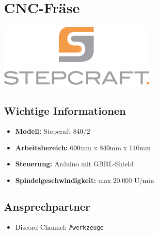 \documentclass{article}
\begin{document}
	
	\noindent
	\begin{minipage}{0.25\textwidth}
		\section*{CNC-Fräse}
	\end{minipage}
	\hfill
	\begin{minipage}{0.2\textwidth}
		\includegraphics[width=\textwidth]{sc-logo.png}
	\end{minipage}
	\hspace{2em}	
	\begin{minipage}{0.1\textwidth}
				
	\end{minipage}%
	
	\subsection*{Wichtige Informationen}
	\begin{itemize}
		\item \textbf{Modell:} Stepcraft 840/2
		\item \textbf{Arbeitsbereich:} 600mm x 840mm x 140mm
		\item \textbf{Steuerung:} Arduino mit GBRL-Shield
		\item \textbf{Spindelgeschwindigkeit:} max 20.000 U/min
	\end{itemize}
	
		\noindent\dotfill
	\subsection*{Ansprechpartner}
	\begin{itemize}
		\item Discord-Channel: \colorbox{gray!30}{\texttt{\#werkzeuge}}
	\end{itemize}
	\dotfill
\end{document}
